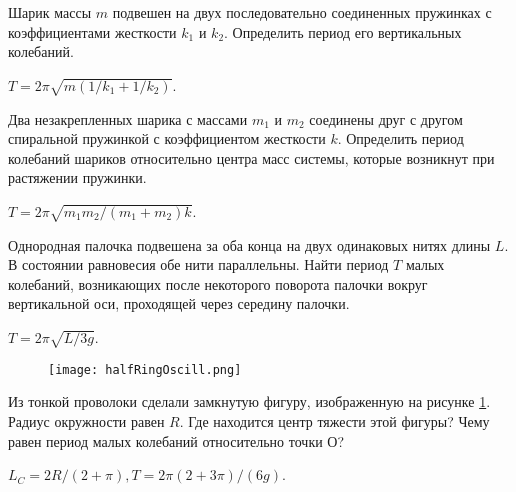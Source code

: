 \begin{ex} %
Шарик массы $m$ подвешен на двух последовательно соединенных пружинках с коэффициентами жесткости $k_1$ и $k_2$. Определить период его вертикальных колебаний.
\begin{ans}
$T = 2 \pi \sqrt{m(1/k_1 + 1/k_2)}$.
\end{ans}
\end{ex}	

\begin{ex} %
Два незакрепленных шарика с массами $m_1$ и $m_2$ соединены друг с другом спиральной пружинкой с коэффициентом жесткости $k$. Определить период колебаний шариков относительно центра масс системы, которые возникнут при растяжении пружинки.
\begin{ans}
$T = 2 \pi \sqrt{m_1m_2/(m_1 + m_2)k}$.
\end{ans}
\end{ex}	

\complexProblems

\begin{ex} %
Однородная палочка подвешена за оба конца на двух одинаковых нитях длины $L$. В состоянии равновесия обе нити параллельны. Найти период $T$ малых колебаний, возникающих после некоторого поворота палочки вокруг вертикальной оси, проходящей через середину палочки.
\begin{ans}
$T = 2 \pi \sqrt{L/3g}$.
\end{ans}
\end{ex}	

\begin{figure}[h]
\centering
\texttt{[image: halfRingOscill.png]}
\caption{}
\label{halfRingOscill}
\end{figure}

\begin{ex}
Из тонкой проволоки сделали замкнутую фигуру, изображенную на рисунке \ref{halfRingOscill}. Радиус окружности равен $R$. Где находится
центр тяжести этой фигуры? Чему равен период малых колебаний относительно точки О?
\begin{ans}
$L_C = 2R/(2 + \pi), T = 2 \pi (2 + 3\pi)/(6g)$.
\end{ans}
\end{ex}	

\clearpage